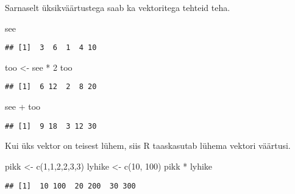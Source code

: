 \documentclass[
]{book}
\newenvironment{Shaded}{\begin{snugshade}}{\end{snugshade}}
\newcommand{\DecValTok}[1]{\textcolor[rgb]{0.00,0.00,0.81}{#1}}
\newcommand{\FunctionTok}[1]{\textcolor[rgb]{0.00,0.00,0.00}{#1}}
\newcommand{\NormalTok}[1]{#1}
\newcommand{\OtherTok}[1]{\textcolor[rgb]{0.56,0.35,0.01}{#1}}
\newcommand{\SpecialCharTok}[1]{\textcolor[rgb]{0.00,0.00,0.00}{#1}}
\begin{document}
Sarnaselt üksikväärtustega saab ka vektoritega tehteid teha.

\begin{Shaded}
\begin{Highlighting}[]
\NormalTok{see}
\end{Highlighting}
\end{Shaded}

\begin{verbatim}
## [1]  3  6  1  4 10
\end{verbatim}

\begin{Shaded}
\begin{Highlighting}[]
\NormalTok{too }\OtherTok{\textless{}{-}}\NormalTok{ see }\SpecialCharTok{*} \DecValTok{2}
\NormalTok{too}
\end{Highlighting}
\end{Shaded}

\begin{verbatim}
## [1]  6 12  2  8 20
\end{verbatim}

\begin{Shaded}
\begin{Highlighting}[]
\NormalTok{see }\SpecialCharTok{+}\NormalTok{ too}
\end{Highlighting}
\end{Shaded}

\begin{verbatim}
## [1]  9 18  3 12 30
\end{verbatim}

Kui üks vektor on teisest lühem, siis R taaskasutab lühema vektori väärtusi.

\begin{Shaded}
\begin{Highlighting}[]
\NormalTok{pikk }\OtherTok{\textless{}{-}} \FunctionTok{c}\NormalTok{(}\DecValTok{1}\NormalTok{,}\DecValTok{1}\NormalTok{,}\DecValTok{2}\NormalTok{,}\DecValTok{2}\NormalTok{,}\DecValTok{3}\NormalTok{,}\DecValTok{3}\NormalTok{)}
\NormalTok{lyhike }\OtherTok{\textless{}{-}} \FunctionTok{c}\NormalTok{(}\DecValTok{10}\NormalTok{, }\DecValTok{100}\NormalTok{)}
\NormalTok{pikk }\SpecialCharTok{*}\NormalTok{ lyhike}
\end{Highlighting}
\end{Shaded}

\begin{verbatim}
## [1]  10 100  20 200  30 300
\end{verbatim}
\end{document}
